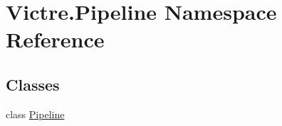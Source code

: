 \hypertarget{namespaceVictre_1_1Pipeline}{\section{Victre.\-Pipeline Namespace Reference}
\label{namespaceVictre_1_1Pipeline}
}
\subsection*{Classes}
\begin{DoxyCompactItemize}
\item 
class \hyperlink{classVictre_1_1Pipeline_1_1Pipeline}{Pipeline}
\end{DoxyCompactItemize}
